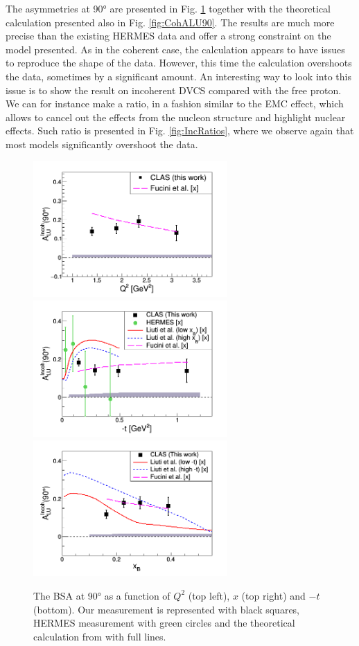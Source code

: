 \documentclass[aps,prc,preprint,superscriptaddress]{revtex4}
\begin{document}
The asymmetries at 90° are presented in Fig. \ref{fig:IncALU} together with the theoretical
calculation presented also in Fig. \ref{fig:CohALU90}. The results are much more precise than 
the existing HERMES data and offer a strong constraint on the model presented. As in the
coherent case, the calculation appears to have issues to reproduce the shape of the data.
However, this time the calculation overshoots the data, sometimes by a significant amount.
An interesting way to look into this issue is to show the result on incoherent DVCS compared 
with the free proton. We can for instance make a ratio, in a fashion similar to the EMC 
effect, which allows to cancel out
the effects from the nucleon structure and highlight nuclear effects. Such ratio is presented
in Fig. \ref{fig:IncRatios}, where we observe again that most models significantly overshoot the data.


\begin{figure}[tbp!]
\center
\includegraphics[width=7.4cm]{fig3/ALU_90_p_vs_Q2_shortscenrario.png}
\includegraphics[width=7.4cm]{fig3/ALU_90_p_vs_t_shortscenrario.png}
\includegraphics[width=7.4cm]{fig3/ALU_90_p_vs_x_shortscenrario.png}
	\caption{The BSA at 90° as a function of  $Q^2$ (top left), $x$ (top right) and 
	$-t$ (bottom). Our measurement is represented with black squares, HERMES 
	measurement \cite{Airapetian:2009cga} with green circles and the theoretical 
	calculation from \cite{Liuti:2005gi} with full lines.}
\label{fig:IncALU}
\end{figure}
\end{document}
